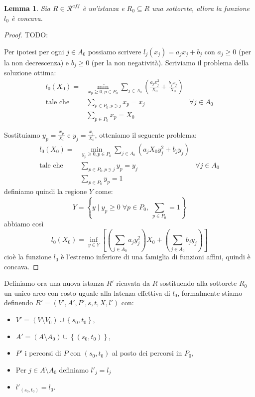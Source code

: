 \documentclass[a4paper]{article}
\newcounter{counter1}
\theoremstyle{plain}
\newtheorem{mylem}[counter1]{Lemma}
\theoremstyle{definition}
\theoremstyle{remark}
\newcommand{\set}[1]{\left\{#1\right\}}
\newcommand{\pa}[1]{\left(#1\right)}
\newcommand{\bra}[1]{\left[#1\right]}
\begin{document}
\begin{mylem}
\label{lem:l0-concava}
  Sia $R\in \mathcal{R}^{aff}$ è un'istanza e $R_0\subseteq R$ una
  sottorete, allora la funzione $l_0$ è concava.
\end{mylem}
\begin{proof}
  TODO: \cite[Lemma 3.11]{menache2011network}

  Per ipotesi per ogni $j\in A_0$ possiamo scrivere $l_j\pa{x_j} = a_j
  x_j + b_j$ con $a_j\ge 0$ (per la non decrescenza) e $b_j \ge 0$
  (per la non negatività). Scriviamo il problema della soluzione
  ottima:
  \begin{align*}
    l_0(X_0) = & \min _{x_p \ge 0, p\in P_0}  \sum _{j\in A_0} \pa{
                 \frac{a_j x_j ^2}{X_0} + \frac{b_j x_j}{X_0}} \\
    \text{tale che } & \sum _{p\in P_0, p\ni j} x_p = x_j & \forall j\in A_0
    \\
    & \sum _{p\in P_0} x_p = X_0
  \end{align*}

  Sostituiamo $y_p = \frac{x_p}{X_0}$ e $y_j = \frac{x_j}{X_0}$,
  otteniamo il seguente problema:
  \begin{align*}
    l_0(X_0) = & \min _{y_p \ge 0, p\in P_0}  \sum _{j\in A_0} \pa{
                 a_j X_0 y_j ^2 + b_j y_j} \\
    \text{tale che } & \sum _{p\in P_0, p\ni j} y_p = y_j & \forall j\in A_0
    \\
    & \sum _{p\in P_0} y_p = 1
  \end{align*}
  definiamo quindi la regione $Y$ come:
  \[ Y = \set { y \mid y_p \ge 0\; \forall p \in P_0, \; \sum _{p\in
        P_0} = 1 } \]
  abbiamo così
  \[ l_0\pa{X_0} = \inf _{y\in Y} \bra{ \pa{ \sum _{j\in A_0} a_j
        y_j^2} X_0 + \pa { \sum _{j\in A_0} b_j y_j} } \]
  cioè la funzione $l_0$ è l'estremo inferiore di una famiglia di
  funzioni affini, quindi è concava.
\end{proof}

Definiamo ora una nuova istanza $R'$ ricavata da $R$ sostituendo alla
sottorete $R_0$ un unico arco con costo uguale alla latenza effettiva
di $l_0$, formalmente stiamo definendo $R'=(V',A',P',s,t,X,l')$ con:
\begin{itemize}
\item $V' = \pa{V\setminus V_0}\cup \set{s_0,t_0}$,
\item $A' = \pa{A\setminus A_0}\cup \set{\pa{s_0,t_0}}$,
\item $P'$ i percorsi di $P$ con $\pa{s_0,t_0}$ al posto dei
  percorsi in $P_0$,
\item Per $j\in A\setminus A_0$ definiamo $l'_j = l_j$
\item $l'_{\pa{s_0,t_0}} = l_0$.
\end{itemize}
\end{document}
